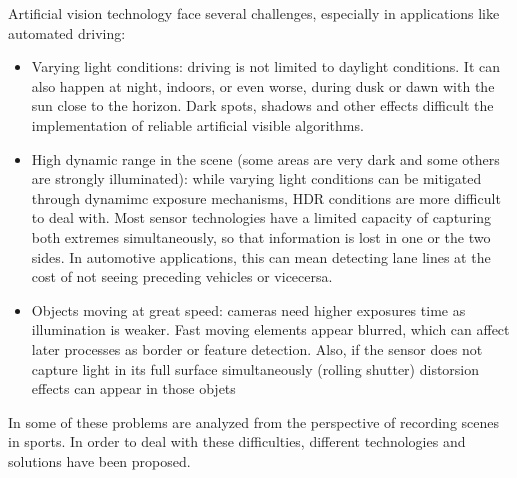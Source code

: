 Artificial vision technology face several challenges, especially in 
applications like automated driving:

\begin{itemize}
    \item Varying light conditions: driving is not limited to daylight 
    conditions. It can also happen at night, indoors, or even worse,
    during dusk or dawn with the sun close to the horizon. Dark spots,
    shadows and other effects difficult the implementation of reliable 
    artificial visible algorithms.
    
    \item High dynamic range in the scene (some areas are very dark 
    and some others are strongly illuminated): while varying light conditions
    can be mitigated through dynamimc exposure mechanisms, HDR conditions
    are more difficult to deal with. Most sensor technologies have a 
    limited capacity of capturing both extremes simultaneously, so that 
    information is lost in one or the two sides. In automotive applications, 
    this can mean detecting lane lines at the cost of not seeing preceding
    vehicles or vicecersa.
    
    
    \item Objects moving at great speed: cameras need higher exposures time as
    illumination is weaker. Fast moving elements appear blurred, which can 
    affect later processes as border or feature detection. Also, if the sensor
    does not capture light in its full surface simultaneously (rolling shutter)
    distorsion effects can appear in those objets
\end{itemize}

In \cite{Pueo2016} some of these problems are analyzed from the perspective of
recording scenes in sports.
In order to deal with these difficulties, different technologies and solutions 
have been proposed. 

